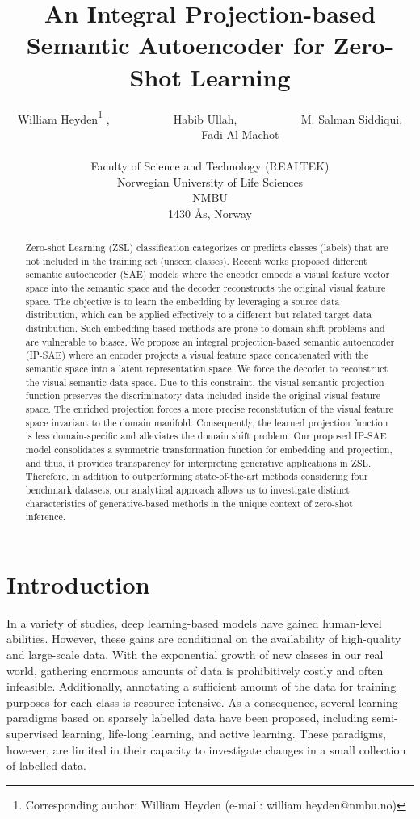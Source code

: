 \documentclass{article}
\title{An Integral Projection-based Semantic Autoencoder for Zero-Shot Learning
}
\author{
  William Heyden\thanks{Corresponding author: William Heyden (e-mail: william.heyden@nmbu.no)} ,
  {~~~~~~~~~~} Habib Ullah, 
  {~~~~~~~~~~} M. Salman Siddiqui, 
  {~~~~~~~~~~} Fadi Al Machot\\
  \\
  Faculty of Science and Technology (REALTEK) \\
  Norwegian University of Life Sciences \\ NMBU \\
  1430 Ås, Norway\\
}
\begin{document}
\maketitle


\begin{abstract}
Zero-shot Learning (ZSL) classification categorizes or predicts classes (labels) that are not included in the training set (unseen classes). Recent works proposed different semantic autoencoder (SAE) models where the encoder embeds a visual feature vector space into the semantic space and the decoder reconstructs the original visual feature space. The objective is to learn the embedding by leveraging a source data distribution, which can be applied effectively to a different but related target data distribution. Such embedding-based methods are prone to domain shift problems and are vulnerable to biases. We propose an integral projection-based semantic autoencoder (IP-SAE) where an encoder projects a visual feature space concatenated with the semantic space into a latent representation space. We force the decoder to reconstruct the visual-semantic data space. Due to this constraint, the visual-semantic projection function preserves the discriminatory data included inside the original visual feature space. The enriched projection forces a more precise reconstitution of the visual feature space invariant to the domain manifold. Consequently, the learned projection function is less domain-specific and alleviates the domain shift problem. Our proposed IP-SAE model consolidates a symmetric transformation function for embedding and projection, and thus, it provides transparency for interpreting generative applications in ZSL. Therefore, in addition to outperforming state-of-the-art methods considering four benchmark datasets, our analytical approach allows us to investigate distinct characteristics of generative-based methods in the unique context of zero-shot inference.
\end{abstract}




\section{Introduction}
\label{sec:introduction}
In a variety of studies, deep learning-based models have gained human-level abilities. However, these gains are conditional on the availability of high-quality and large-scale data. With the exponential growth of new classes in our real world, gathering enormous amounts of data is prohibitively costly and often infeasible. Additionally, annotating a sufficient amount of the data for training purposes for each class is resource intensive. As a consequence, several learning paradigms based on sparsely labelled data have been proposed, including semi-supervised learning, life-long learning, and active learning. These paradigms, however, are limited in their capacity to investigate changes in a small collection of labelled data. 
\end{document}
